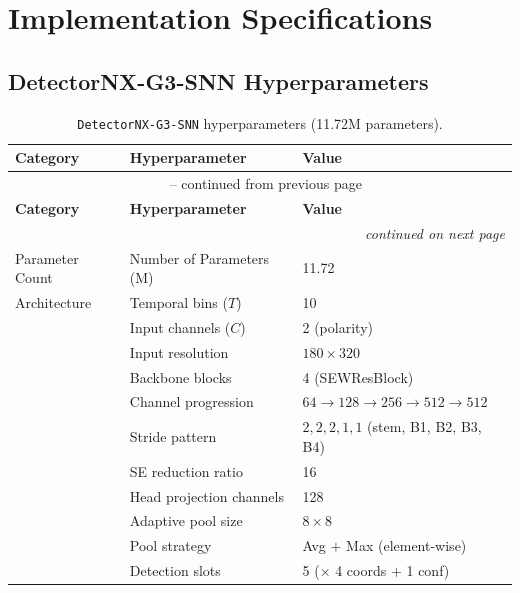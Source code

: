 \chapter{Implementation Specifications}

\section{DetectorNX-G3-SNN Hyperparameters}

{\small
\begin{longtable}{|l|l|l|}
\caption[\texttt{DetectorNX-G3-SNN} hyperparameters.]{\texttt{DetectorNX-G3-SNN} hyperparameters (11.72M parameters).} \label{tab_app:g3_snn_params} \\
\hline
\textbf{Category} & \textbf{Hyperparameter} & \textbf{Value} \\
\hline
\endfirsthead
%
\multicolumn{3}{c}{\tablename\ \thetable{} -- continued from previous page} \\
\hline
\textbf{Category} & \textbf{Hyperparameter} & \textbf{Value} \\
\hline
\endhead
%
\hline \multicolumn{3}{r}{\textit{continued on next page}} \\
\endfoot
%
\hline
\endlastfoot
%
Parameter Count  & Number of Parameters (M)             & 11.72 \\
\hline   
Architecture     & Temporal bins ($T$)                  & 10 \\
                 & Input channels ($C$)                 & 2 (polarity) \\
                 & Input resolution                     & $180 \times 320$ \\
                 & Backbone blocks                      & 4 (SEWResBlock) \\
                 & Channel progression                  & $64 \to 128 \to 256 \to 512 \to 512$ \\
                 & Stride pattern                       & $2, 2, 2, 1, 1$ (stem, B1, B2, B3, B4) \\
                 & SE reduction ratio                   & 16 \\
                 & Head projection channels             & 128 \\
                 & Adaptive pool size                   & $8 \times 8$ \\
                 & Pool strategy                        & Avg $+$ Max (element-wise) \\
                 & Detection slots                      & 5 ($\times$ 4 coords $+$ 1 conf) \\

\end{longtable}}
